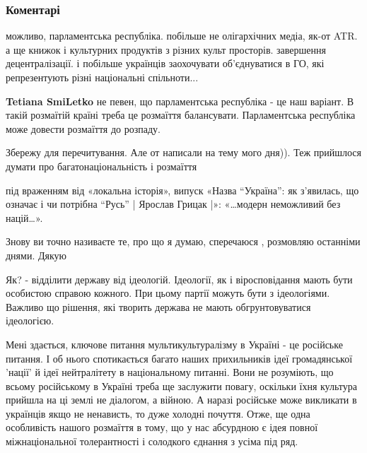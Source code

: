  
 
 
 
 
\subsubsection{Коментарі}

\begin{itemize} %

можливо, парламентська республіка. побільше не олігархічних медіа, як-от ATR. а
ще книжок і культурних продуктів з різних культ просторів. завершення
децентралізації. і побільше українців заохочувати об’єднуватися в ГО, які
репрезентують різні національні спільноти...

\begin{itemize} %
\textbf{Tetiana SmiLetko} не певен, що парламентська республіка - це наш
варіант. В такій розмаїтій країні треба це розмаїття балансувати. Парламентська
республіка може довести розмаїття до розпаду.
\end{itemize} %

Збережу для перечитування. Але от написали на тему мого дня)). Теж прийшлося думати про багатонаціональність і розмаїття


під враженням від «локальна історія», випуск «Назва “Україна”: як з’явилась, що
означає і чи потрібна “Русь” | Ярослав Грицак |»: «…модерн неможливий без
націй…».


Знову ви точно називаєте те, про що я думаю, сперечаюся , розмовляю останніми днями. Дякую

Як? - відділити державу від ідеологій.
Ідеології, як і віросповідання мають бути особистою справою кожного. При цьому партії можуть бути з ідеологіями. Важливо що рішення, які творить держава не мають обгрунтовуватися ідеологією.


Мені здається, ключове питання мультикультуралізму в Україні - це російське
питання. І об нього спотикається багато наших прихильників ідеї громадянської
'нації' й ідеї нейтралітету в національному питанні. Вони не розуміють, що
всьому російському в Україні треба ще заслужити повагу, оскільки їхня культура
прийшла на ці землі не діалогом, а війною. А наразі російське може викликати в
українців якщо не ненависть, то дуже холодні почуття. Отже, ще одна особливість
нашого розмаїття в тому, що у нас абсурдною є ідея повної міжнаціональної
толерантності і солодкого єднання з усіма під ряд.


\end{itemize}
